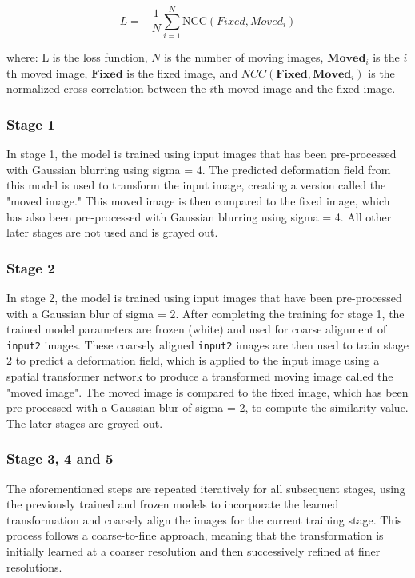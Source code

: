 \documentclass{book}
\begin{document}
	\begin{equation}
		L = -\frac{1}{N} \sum_{i=1}^N \text{NCC}(Fixed, Moved_i)
	\end{equation}
	
	where:
		$\text{L}$ is the loss function, $N$ is the number of moving images, $\mathbf{Moved}_i$ is the $i$th moved image, $\mathbf{Fixed}$ is the fixed image, and $NCC(\mathbf{Fixed}, \mathbf{Moved}_i)$ is the normalized cross correlation between the $i$th moved image and the fixed image.
	
	\subsubsection{Stage 1}
	In stage 1, the model is trained using input images that has been pre-processed with Gaussian blurring using sigma = 4. The predicted deformation field from this model is used to transform the input image, creating a version called the "moved image." This moved image is then compared to the fixed image, which has also been pre-processed with Gaussian blurring using sigma = 4. All other later stages are not used and is grayed out.
	
	\subsubsection{Stage 2}
	In stage 2, the model is trained using input images that have been pre-processed with a Gaussian blur of sigma = 2. After completing the training for stage 1, the trained model parameters are frozen (white) and used for coarse alignment of \texttt{input2} images. These coarsely aligned \texttt{input2} images are then used to train stage 2 to predict a deformation field, which is applied to the input image using a spatial transformer network to produce a transformed moving image called the "moved image". The moved image is compared to the fixed image, which has been pre-processed with a Gaussian blur of sigma = 2, to compute the similarity value. The later stages are grayed out.
	
	\subsubsection{Stage 3, 4 and 5}
	The aforementioned steps are repeated iteratively for all subsequent stages, using the previously trained and frozen models to incorporate the learned transformation and coarsely align the images for the current training stage. This process follows a coarse-to-fine approach, meaning that the transformation is initially learned at a coarser resolution and then successively refined at finer resolutions.
	
\end{document}

